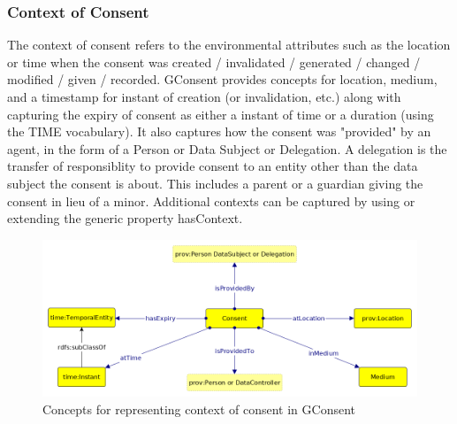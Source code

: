 \subsubsection{Context of Consent}
The context of consent refers to the environmental attributes such as the location or time when the consent was created / invalidated / generated / changed / modified / given / recorded. GConsent provides concepts for location, medium, and a timestamp for instant of creation (or invalidation, etc.) along with capturing the expiry of consent as either a instant of time or a duration (using the TIME vocabulary). It also captures how the consent was "provided" by an agent, in the form of a Person or Data Subject or Delegation. A delegation is the transfer of responsiblity to provide consent to an entity other than the data subject the consent is about. This includes a parent or a guardian giving the consent in lieu of a minor. Additional contexts can be captured by using or extending the generic property hasContext.
\begin{figure}[htbp]
    \centering
    \includegraphics[width=0.8\linewidth]{img/gconsent_context.png}
    \caption{Concepts for representing context of consent in GConsent \cite{}}
    \label{fig:vocabs:gconsent-context}
\end{figure}


